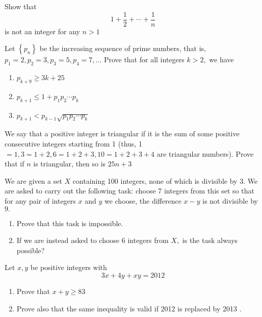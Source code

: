 \documentclass{pset}
\begin{document}
\begin{problems}
    \begin{problem}
    Show that
    $$
        1+\frac{1}{2}+\cdots+\frac{1}{n}
    $$
    is not an integer for any \(n>1\)
    \end{problem}

    \begin{problem}
    Let \(\left\{p_{n}\right\}\) be the increasing sequence of prime numbers, that is,
    \(p_{1}=2, p_{2}=3, p_{3}=5, p_{4}=7, \ldots\)
    Prove that for all integers \(k>2,\) we have
    \begin{enumerate}
        \item \(p_{k+9} \geq 3 k+25\)
        \item \(p_{k+1} \leq 1+p_{1} p_{2} \cdots p_{k}\)
        \item \(p_{k+1}<p_{k-1} \sqrt{p_{1} p_{2} \cdots p_{k}}\)
    \end{enumerate}
    \end{problem}

    \begin{problem}
    We say that a positive integer is triangular if it is the sum of some positive consecutive integers starting from 1 (thus, 1 \(=1,3=1+2,6=1+2+3,10=1+2+3+4\) are triangular numbers). Prove that if \(n\) is triangular, then so is \(25 n+3\)
    \end{problem}

    \begin{problem}
    We are given a set \(X\) containing 100 integers, none of which is divisible by \(3 .\) We are asked to carry out the following task: choose 7 integers from this set so that for any pair of integers \(x\) and \(y\) we choose, the difference \(x-y\) is not divisible by \(9 .\)
    \begin{enumerate}
        \item Prove that this task is impossible.
        \item If we are instead asked to choose 6 integers from \(X,\) is the task always possible?
    \end{enumerate}
    \end{problem}

    \begin{problem}
    Let \(x, y\) be positive integers with
    $$
        3 x+4 y+x y=2012
    $$
    \begin{enumerate}
        \item Prove that \(x+y \geq 83\)
        \item Prove also that the same inequality is valid if 2012 is replaced by 2013 .
    \end{enumerate}
    \end{problem}


\end{problems}
\end{document}
